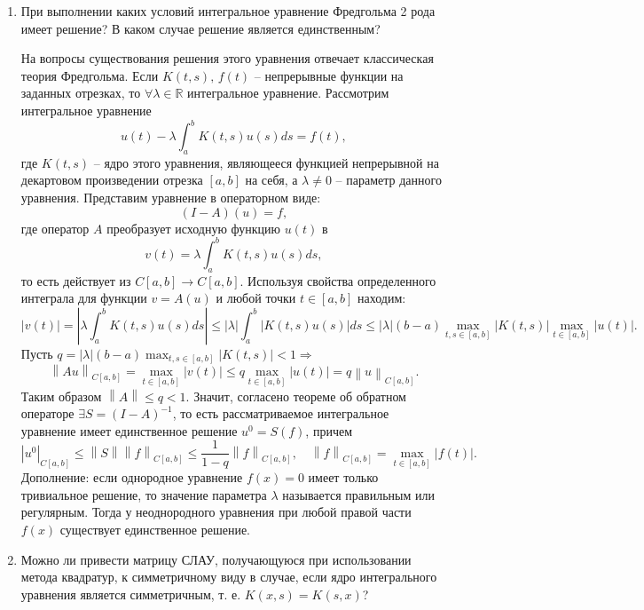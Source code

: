 \documentclass[12pt, a4paper]{article}
\newcommand{\norm}[1]{\left\lVert#1\right\rVert}
\begin{document}
\begin{enumerate}
\item При выполнении каких условий интегральное уравнение Фредгольма 2 рода имеет решение? В каком случае решение является единственным?

На вопросы существования решения этого уравнения отвечает классическая теория Фредгольма.
Если $ K(t, s),\,f(t) $ -- непрерывные функции на заданных отрезках, то $\forall \lambda \in \mathbb{R}$ интегральное уравнение. Рассмотрим интегральное уравнение 
\[
u(t) - \lambda \displaystyle \int_a^b K(t, s) u(s) ds = f(t),
\]
\noindent где $ K(t, s) $ -- ядро этого уравнения, являющееся функцией непрерывной на декартовом произведении отрезка $[a, b]$ на себя, а $ \lambda \neq 0$ -- параметр данного уравнения. Представим уравнение в операторном виде:
\[
(I - A)(u) = f,  
\]
\noindent где оператор $A$ преобразует исходную функцию $ u(t) $ в 
\[
v(t) = \lambda \displaystyle \int_a^b K(t, s)u(s)ds,  
\]
\noindent то есть действует из $C[a,b] \rightarrow C[a, b]$. Используя свойства определенного интеграла для функции $ v = A(u) $ и любой точки $ t \in [a, b] $ находим:
\[
| v(t) | = | \lambda \displaystyle \int_a^b K(t, s)u(s) ds | \leq | \lambda | \displaystyle \int_a^b | K(t, s) u(s) | ds \leq |\lambda|(b-a) \max_{t, s \in [a, b]} | K(t, s) | \max_{t \in [a, b]} |u(t)|.
\]
Пусть $ q = | \lambda |(b-a) \displaystyle \max_{t, s \in [a, b]} | K(t, s) | < 1  \Rightarrow $
\[
\norm{ Au }_{C[a, b]} = \max_{t \in [a, b]} | v(t) | \leq q \max_{ t \in [a, b] } | u(t) | = q \norm{u}_{C[a, b]}.
\]
Таким образом $ \norm{A} \leq q < 1 $. Значит, согласено теореме об обратном операторе $ \exists S = (I - A)^{-1} $, то есть рассматриваемое интегральное уравнение имеет единственное решение $u^0 = S(f)$, причем 
\[
| u^0 |_{C[a, b]} \leq \norm{S} \norm{f}_{C[a, b]} \leq \dfrac{1}{1 - q} \norm{f}_{C[a, b]}, \quad \norm{f}_{C[a, b]} = \max_{t \in [a, b]} |f(t)|.
\]
Дополнение: если однородное уравнение $ f(x) = 0 $ имеет только тривиальное решение, то значение параметра $ \lambda $ называется правильным или регулярным. Тогда у неоднородного уравнения при любой правой части $ f(x) $ существует единственное решение.

\item Можно ли привести матрицу СЛАУ, получающуюся при использовании метода квадратур, к симметричному виду в случае, если ядро интегрального уравнения является симметричным, т. е. $ K(x, s) = K(s, x) $?


\end{enumerate}
\end{document}
